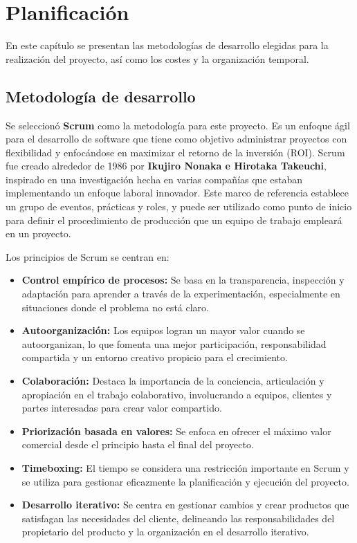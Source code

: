 \chapter{Planificación}
\label{chap:planificacion}

\lettrine{E}{}n este capítulo se presentan las metodologías de desarrollo elegidas para la realización del proyecto, así como los costes y la organización temporal.

\section{Metodología de desarrollo}

Se seleccionó \textbf{Scrum} \cite{sachdeva2016scrum} como la metodología para este proyecto. Es un enfoque ágil para el desarrollo de software que tiene como objetivo administrar proyectos con flexibilidad y enfocándose en maximizar el retorno de la inversión (ROI). Scrum fue creado alrededor de 1986 por \textbf{Ikujiro Nonaka e Hirotaka Takeuchi}, inspirado en una investigación hecha en varias compañías que estaban implementando un enfoque laboral innovador. Este marco de referencia establece un grupo de eventos, prácticas y roles, y puede ser utilizado como punto de inicio para definir el procedimiento de producción que un equipo de trabajo empleará en un proyecto.


Los principios de Scrum se centran en:

\begin{itemize}
\item \textbf{Control empírico de procesos:} Se basa en la transparencia, inspección y adaptación para aprender a través de la experimentación, especialmente en situaciones donde el problema no está claro.
\item \textbf{Autoorganización:}  Los equipos logran un mayor valor cuando se autoorganizan, lo que fomenta una mejor participación, responsabilidad compartida y un entorno creativo propicio para el crecimiento. 
\item \textbf{Colaboración:} Destaca la importancia de la conciencia, articulación y apropiación en el trabajo colaborativo, involucrando a equipos, clientes y partes interesadas para crear valor compartido.
\item \textbf{ Priorización basada en valores:} Se enfoca en ofrecer el máximo valor comercial desde el principio hasta el final del proyecto.
\item \textbf{Timeboxing:} El tiempo se considera una restricción importante en Scrum y se utiliza para gestionar eficazmente la planificación y ejecución del proyecto.
\item \textbf{Desarrollo iterativo:} Se centra en gestionar cambios y crear productos que satisfagan las necesidades del cliente, delineando las responsabilidades del propietario del producto y la organización en el desarrollo iterativo.
\end{itemize}

